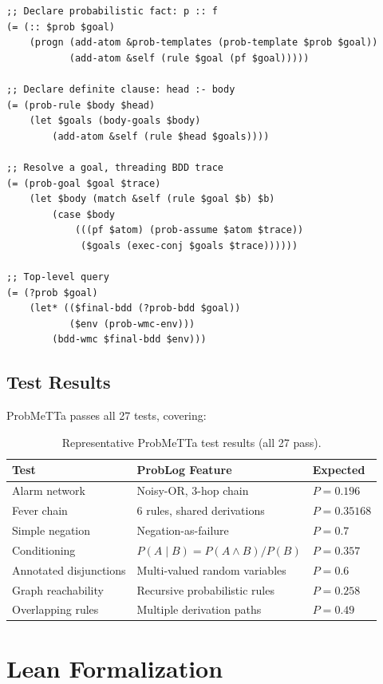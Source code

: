 \documentclass[11pt,a4paper]{article}
\theoremstyle{definition}
\begin{document}
\begin{lstlisting}[language=MeTTa]
;; Declare probabilistic fact: p :: f
(= (:: $prob $goal)
    (progn (add-atom &prob-templates (prob-template $prob $goal))
           (add-atom &self (rule $goal (pf $goal)))))

;; Declare definite clause: head :- body
(= (prob-rule $body $head)
    (let $goals (body-goals $body)
        (add-atom &self (rule $head $goals))))

;; Resolve a goal, threading BDD trace
(= (prob-goal $goal $trace)
    (let $body (match &self (rule $goal $b) $b)
        (case $body
            (((pf $atom) (prob-assume $atom $trace))
             ($goals (exec-conj $goals $trace))))))

;; Top-level query
(= (?prob $goal)
    (let* (($final-bdd (?prob-bdd $goal))
           ($env (prob-wmc-env)))
        (bdd-wmc $final-bdd $env)))
\end{lstlisting}

\subsection{Test Results}

ProbMeTTa passes all 27 tests, covering:

\begin{table}[h]
\centering
\begin{tabular}{lll}
\toprule
\textbf{Test} & \textbf{ProbLog Feature} & \textbf{Expected} \\
\midrule
Alarm network & Noisy-OR, 3-hop chain & $P = 0.196$ \\
Fever chain & 6 rules, shared derivations & $P = 0.35168$ \\
Simple negation & Negation-as-failure & $P = 0.7$ \\
Conditioning & $P(A \mid B) = P(A \wedge B)/P(B)$ & $P = 0.357$ \\
Annotated disjunctions & Multi-valued random variables & $P = 0.6$ \\
Graph reachability & Recursive probabilistic rules & $P = 0.258$ \\
Overlapping rules & Multiple derivation paths & $P = 0.49$ \\
\bottomrule
\end{tabular}
\caption{Representative ProbMeTTa test results (all 27 pass).}
\end{table}

\section{Lean Formalization}
\end{document}
